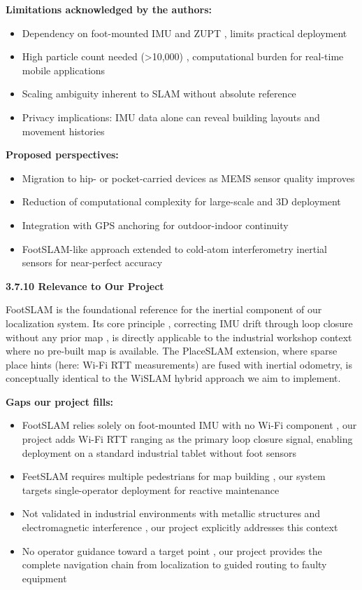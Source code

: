 \documentclass{ipgpmaster}
\begin{document}
\textbf{Limitations acknowledged by the authors:}

\begin{itemize}
    \item Dependency on foot-mounted IMU and ZUPT ,  limits practical deployment
    \item High particle count needed (>10,000) ,  computational burden for real-time mobile applications
    \item Scaling ambiguity inherent to SLAM without absolute reference
    \item Privacy implications: IMU data alone can reveal building layouts and movement histories
\end{itemize}
\textbf{Proposed perspectives:}

\begin{itemize}
    \item Migration to hip- or pocket-carried devices as MEMS sensor quality improves
    \item Reduction of computational complexity for large-scale and 3D deployment
    \item Integration with GPS anchoring for outdoor-indoor continuity
    \item FootSLAM-like approach extended to cold-atom interferometry inertial sensors for near-perfect accuracy

\end{itemize}
\textbf{3.7.10      Relevance to Our Project}

FootSLAM is the foundational reference for the inertial component of our localization system. Its core principle ,  correcting IMU drift through loop closure without any prior map ,  is directly applicable to the industrial workshop context where no pre-built map is available. The PlaceSLAM extension, where sparse place hints (here: Wi-Fi RTT measurements) are fused with inertial odometry, is conceptually identical to the WiSLAM hybrid approach we aim to implement.

\textbf{Gaps our project fills:}

\begin{itemize}
    \item FootSLAM relies solely on foot-mounted IMU with no Wi-Fi component ,  our project adds Wi-Fi RTT ranging as the primary loop closure signal, enabling deployment on a standard industrial tablet without foot sensors
    \item FeetSLAM requires multiple pedestrians for map building ,  our system targets single-operator deployment for reactive maintenance
    \item Not validated in industrial environments with metallic structures and electromagnetic interference ,  our project explicitly addresses this context
    \item No operator guidance toward a target point ,  our project provides the complete navigation chain from localization to guided routing to faulty equipment
\end{itemize}
\end{document}
